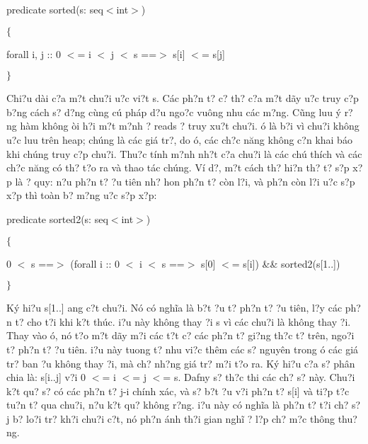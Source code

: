 \documentclass{article} %
\begin{document}
predicate sorted(s: seq$<$int$>$)

$\{$

forall i, j :: 0 $<$= i $<$ j $<$ {\textbar}s{\textbar} ==$>$ s[i] $<$= s[j]

$\}$

Chi?u d\`{a}i c?a m?t chu?i {\dj}u?c vi?t {\textbar}s{\textbar}. C\'{a}c ph?n t? c? th? c?a m?t d\~{a}y {\dj}u?c truy c?p b?ng c\'{a}ch s? d?ng c\`{u}ng c\'{u} ph\'{a}p d?u ngo?c vu\^{o}ng nhu c\'{a}c m?ng. C\~{u}ng luu \'{y} r?ng h\`{a}m kh\^{o}ng {\dj}\`{o}i h?i m?t m?nh {\dj}? reads {\dj}? truy xu?t chu?i. {\DJ}\'{o} l\`{a} b?i v\`{i} chu?i kh\^{o}ng {\dj}u?c luu tr\^{e}n heap; ch\'{u}ng l\`{a} c\'{a}c gi\'{a} tr?, do {\dj}\'{o}, c\'{a}c ch?c n\u{a}ng kh\^{o}ng c?n khai b\'{a}o khi ch\'{u}ng truy c?p chu?i. Thu?c t\'{i}nh m?nh nh?t c?a chu?i l\`{a} c\'{a}c ch\'{u} th\'{i}ch v\`{a} c\'{a}c ch?c n\u{a}ng c\'{o} th? t?o ra v\`{a} thao t\'{a}c ch\'{u}ng. V\'{i} d?, m?t c\'{a}ch th? hi?n th? t? s?p x?p l\`{a} {\dj}? quy: n?u ph?n t? {\dj}?u ti\^{e}n nh? hon ph?n t? c\`{o}n l?i, v\`{a} ph?n c\`{o}n l?i {\dj}u?c s?p x?p th\`{i} to\`{a}n b? m?ng {\dj}u?c s?p x?p:

predicate sorted2(s: seq$<$int$>$)

$\{$

0  $<$ {\textbar}s{\textbar} ==$>$ (forall i :: 0 $<$ i $<$ {\textbar}s{\textbar} ==$>$ s[0] $<$= s[i]) \&\& sorted2(s[1..])

$\}$

K\'{y} hi?u s[1..] {\dj}ang c?t chu?i. N\'{o} c\'{o} ngh\~{i}a l\`{a} b?t {\dj}?u t? ph?n t? {\dj}?u ti\^{e}n, l?y c\'{a}c ph?n t? cho t?i khi k?t th\'{u}c. {\DJ}i?u n\`{a}y kh\^{o}ng thay {\dj}?i s v\`{i} c\'{a}c chu?i l\`{a} kh\^{o}ng thay {\dj}?i. Thay v\`{a}o {\dj}\'{o}, n\'{o} t?o m?t d\~{a}y m?i c\'{a}c t?t c? c\'{a}c ph?n t? gi?ng th?c t? tr\^{e}n, ngo?i t? ph?n t? {\dj}?u ti\^{e}n. {\DJ}i?u n\`{a}y tuong t? nhu vi?c th\^{e}m c\'{a}c s? nguy\^{e}n trong {\dj}\'{o} c\'{a}c gi\'{a} tr? ban {\dj}?u kh\^{o}ng thay {\dj}?i, m\`{a} ch? nh?ng gi\'{a} tr? m?i t?o ra. K\'{y} hi?u c?a s? ph\^{a}n chia l\`{a}: s[i..j] v?i 0 $<$= i $<$= j $<$= {\textbar}s{\textbar}. Dafny s? th?c thi c\'{a}c ch? s? n\`{a}y. Chu?i k?t qu? s? c\'{o} c\'{a}c ph?n t? j-i ch\'{i}nh x\'{a}c, v\`{a} s? b?t {\dj}?u v?i ph?n t? s[i] v\`{a} ti?p t?c tu?n t? qua chu?i, n?u k?t qu? kh\^{o}ng r?ng. {\DJ}i?u n\`{a}y c\'{o} ngh\~{i}a l\`{a} ph?n t? t?i ch? s? j b? lo?i tr? kh?i chu?i c?t, n\'{o} ph?n \'{a}nh th?i gian ngh\~{i} {\dj}? l?p ch? m?c th\^{o}ng thu?ng.
\end{document}
